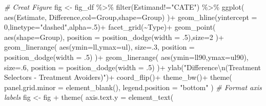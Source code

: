 \documentclass[
]{article}
\newenvironment{Shaded}{\begin{snugshade}}{\end{snugshade}}
\newcommand{\AttributeTok}[1]{\textcolor[rgb]{0.77,0.63,0.00}{#1}}
\newcommand{\CommentTok}[1]{\textcolor[rgb]{0.56,0.35,0.01}{\textit{#1}}}
\newcommand{\DecValTok}[1]{\textcolor[rgb]{0.00,0.00,0.81}{#1}}
\newcommand{\FunctionTok}[1]{\textcolor[rgb]{0.00,0.00,0.00}{#1}}
\newcommand{\NormalTok}[1]{#1}
\newcommand{\OtherTok}[1]{\textcolor[rgb]{0.56,0.35,0.01}{#1}}
\newcommand{\SpecialCharTok}[1]{\textcolor[rgb]{0.00,0.00,0.00}{#1}}
\newcommand{\StringTok}[1]{\textcolor[rgb]{0.31,0.60,0.02}{#1}}
\begin{document}
\begin{Shaded}
\begin{Highlighting}[]
  
  \CommentTok{\# Creat Figure }
\NormalTok{  fig }\OtherTok{\textless{}{-}}\NormalTok{ fig\_df }\SpecialCharTok{\%\textgreater{}\%}
    \FunctionTok{filter}\NormalTok{(Estimand}\SpecialCharTok{!=}\StringTok{"CATE"}\NormalTok{) }\SpecialCharTok{\%\textgreater{}\%} 
    \FunctionTok{ggplot}\NormalTok{(}
      \FunctionTok{aes}\NormalTok{(Estimate, Difference,}\AttributeTok{col=}\NormalTok{Group,}\AttributeTok{shape=}\NormalTok{Group)}
\NormalTok{    )}\SpecialCharTok{+}
    \FunctionTok{geom\_hline}\NormalTok{(}\AttributeTok{yintercept =} \DecValTok{0}\NormalTok{,}\AttributeTok{linetype=}\StringTok{"dashed"}\NormalTok{,}\AttributeTok{alpha=}\NormalTok{.}\DecValTok{5}\NormalTok{)}\SpecialCharTok{+}
    \FunctionTok{facet\_grid}\NormalTok{(}\SpecialCharTok{\textasciitilde{}}\NormalTok{Type)}\SpecialCharTok{+}
    \FunctionTok{geom\_point}\NormalTok{(}
      \FunctionTok{aes}\NormalTok{(}\AttributeTok{shape=}\NormalTok{Group),}
      \AttributeTok{position =} \FunctionTok{position\_dodge}\NormalTok{(}\AttributeTok{width =}\NormalTok{ .}\DecValTok{5}\NormalTok{),}\AttributeTok{size=}\DecValTok{2}
\NormalTok{    )}\SpecialCharTok{+}
    \FunctionTok{geom\_linerange}\NormalTok{(}
      \FunctionTok{aes}\NormalTok{(}\AttributeTok{ymin=}\NormalTok{ll,}\AttributeTok{ymax=}\NormalTok{ul),}
      \AttributeTok{size=}\NormalTok{.}\DecValTok{3}\NormalTok{,}
      \AttributeTok{position =} \FunctionTok{position\_dodge}\NormalTok{(}\AttributeTok{width =}\NormalTok{ .}\DecValTok{5}\NormalTok{)}
\NormalTok{    )}\SpecialCharTok{+}
    \FunctionTok{geom\_linerange}\NormalTok{(}
      \FunctionTok{aes}\NormalTok{(}\AttributeTok{ymin=}\NormalTok{ll90,}\AttributeTok{ymax=}\NormalTok{ul90),}
      \AttributeTok{size=}\NormalTok{.}\DecValTok{6}\NormalTok{,}
      \AttributeTok{position =} \FunctionTok{position\_dodge}\NormalTok{(}\AttributeTok{width =}\NormalTok{ .}\DecValTok{5}\NormalTok{)}
\NormalTok{    )}\SpecialCharTok{+}
    \FunctionTok{ylab}\NormalTok{(}\StringTok{"Difference}\SpecialCharTok{\textbackslash{}n}\StringTok{(Treatment Selectors {-} Treatment Avoiders)"}\NormalTok{)}\SpecialCharTok{+}
    \FunctionTok{coord\_flip}\NormalTok{()}\SpecialCharTok{+}
    \FunctionTok{theme\_bw}\NormalTok{()}\SpecialCharTok{+}
    \FunctionTok{theme}\NormalTok{(}
      \AttributeTok{panel.grid.minor =} \FunctionTok{element\_blank}\NormalTok{(),}
      \AttributeTok{legend.position =} \StringTok{"bottom"}
\NormalTok{    )}
  \CommentTok{\# Format axis labels}
\NormalTok{  fig }\OtherTok{\textless{}{-}}\NormalTok{ fig }\SpecialCharTok{+}
    \FunctionTok{theme}\NormalTok{(}
      \AttributeTok{axis.text.y =} \FunctionTok{element\_text}\NormalTok{(}

\end{Highlighting}
\end{Shaded}
\end{document}
